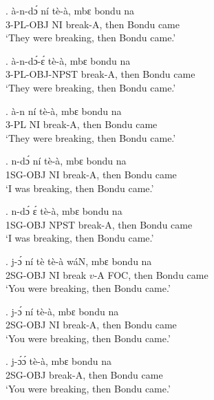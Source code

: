 \documentclass{assets/fieldnotes}
\begin{document}
\exg.
à-n-dɔ́      ní   tè-à,      mbɛ    bondu   na   \\
3-PL-OBJ   NI   break-A,   then   Bondu   came \\%
`They were breaking, then Bondu came.' \label{33574}

\exg.
à-n-dɔ́-ɛ́         tè-à,      mbɛ    bondu   na   \\
3-PL-OBJ-NPST   break-A,   then   Bondu   came \\%
`They were breaking, then Bondu came.' \label{39200}

\exg.
à-n    ní   tè-à,      mbɛ    bondu   na   \\
3-PL   NI   break-A,   then   Bondu   came \\%
`They were breaking, then Bondu came.' \label{58506}


\exg.
n-dɔ́       ní   tè-à,      mbɛ    bondu   na   \\
1SG-OBJ   NI   break-A,   then   Bondu   came \\%
`I was breaking, then Bondu came.'

\exg.
n-dɔ́       ɛ́      tè-à,      mbɛ    bondu   na   \\
1SG-OBJ   NPST   break-A,   then   Bondu   came \\%
`I was breaking, then Bondu came.'

\exg.
j-ɔ́        ní   tè      tè-à    wáN,   mbɛ    bondu   na   \\
2SG-OBJ   NI   break   $v$-A   FOC,   then   Bondu   came \\%
`You were breaking, then Bondu came.' \label{25043}


\exg.
j-ɔ́        ní   tè-à,      mbɛ    bondu   na   \\
2SG-OBJ   NI   break-A,   then   Bondu   came \\%
`You were breaking, then Bondu came.'

\exg.
j-ɔ́ɔ́            tè-à,      mbɛ    bondu   na   \\
2SG-OBJ   break-A,   then   Bondu   came \\%
`You were breaking, then Bondu came.' \label{14489}
\end{document}
